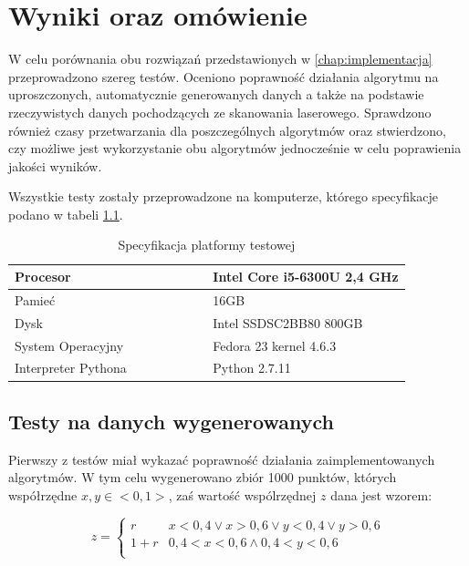 \chapter{Wyniki oraz omówienie}
\label{chap:wyniki}

W celu porównania obu rozwiązań przedstawionych w \autoref{chap:implementacja} przeprowadzono szereg testów.
Oceniono poprawność działania algorytmu na uproszczonych, automatycznie generowanych danych a także na podstawie
rzeczywistych danych pochodzących ze skanowania laserowego. Sprawdzono również czasy przetwarzania dla poszczególnych
algorytmów oraz stwierdzono, czy możliwe jest wykorzystanie obu algorytmów jednocześnie w celu poprawienia jakości wyników.

Wszystkie testy zostały przeprowadzone na komputerze, którego specyfikacje podano w tabeli \ref{tab:specyfikacja}.

\begin{table}[h!]
    \centering
    \begin{tabular}{|p{0.5\linewidth}|p{0.5\linewidth}|}
        \hline
        Procesor & Intel Core i5-6300U 2,4 GHz \\
        \hline
		Pamieć & 16GB \\
		\hline
		Dysk & Intel SSDSC2BB80 800GB \\
		\hline
		System Operacyjny & Fedora 23 kernel 4.6.3 \\
		\hline
		Interpreter Pythona & Python 2.7.11 \\
		\hline
    \end{tabular}
    \caption{Specyfikacja platformy testowej}
    \label{tab:specyfikacja}
\end{table}

\section{Testy na danych wygenerowanych}
Pierwszy z testów miał wykazać poprawność działania zaimplementowanych algorytmów. W tym celu wygenerowano zbiór 1000 punktów,
których współrzędne $x,y \in <0,1>$, zaś wartość wspólrzędnej $z$ dana jest wzorem:

\begin{displaymath}
    z = \left\{ \begin{array}{ll}
        r & \textrm{$x < 0,4 \vee x > 0,6 \vee y < 0,4 \vee y > 0,6$}\\
        1 + r & \textrm{$0,4 < x < 0,6 \wedge 0,4 < y < 0,6$}\\
    \end{array} \right.
\end{displaymath}



